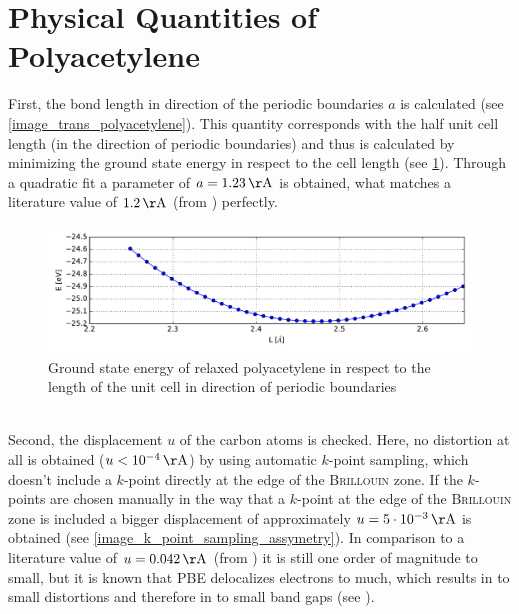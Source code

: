 \section{Physical Quantities of Polyacetylene}
First, the bond length in direction of the periodic boundaries $a$ is calculated (see \cref{image_trans_polyacetylene}). This quantity corresponds with the half unit cell length (in the direction of periodic boundaries) and thus is calculated by minimizing the ground state energy in respect to the cell length (see \cref{image_poly_cell_len}). Through a quadratic fit a parameter of $a = \unit[1.23]{\AA}$ is obtained, what matches a literature value of $\unit[1.2]{\AA}$ (from \cite{PhysRevLett.42.1698}) perfectly.\\
\begin{figure}[!h]
	\centering
	\includegraphics[width = 13cm]{Images/polyacetylene/convergence/unit_cell_length}
	\caption{Ground state energy of relaxed polyacetylene in respect to the length of the unit cell in direction of periodic boundaries}
	\label{image_poly_cell_len}
\end{figure}
\\
Second, the displacement $u$ of the carbon atoms is checked. Here, no distortion at all is obtained ($u < \unit[10^{-4}]{\AA}$) by using automatic $k$-point sampling, which doesn't include a $k$-point directly at the edge of the \textsc{Brillouin} zone. If the $k$-points are chosen manually in the way that a $k$-point at the edge of the \textsc{Brillouin} zone is included a bigger displacement of approximately $u = \unit[5\cdot10^{-3}]{\AA}$ is obtained (see \cref{image_k_point_sampling_assymetry}). In comparison to a literature value of $u = \unit[0.042]{\AA}$ (from \cite{PhysRevLett.42.1698, doi:10.1021/cr990357p}) it is still one order of magnitude to small, but it is known that PBE delocalizes electrons to much, which results in to small distortions and therefore in to small band gaps (see \cite{JIANG2009120,PhysRevB.84}).\\
